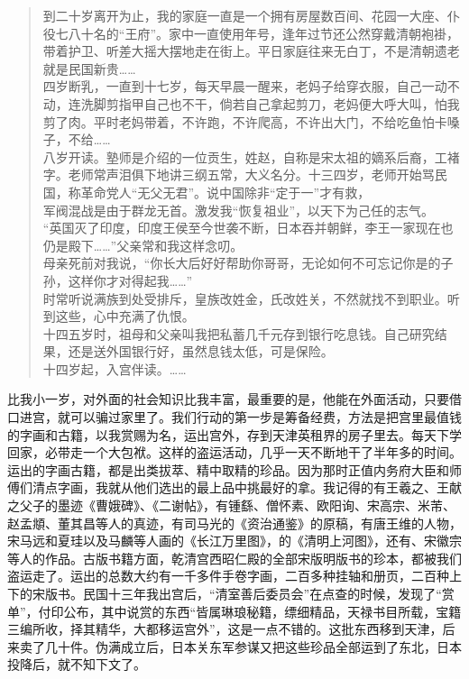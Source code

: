 \begin{quote}
	到二十岁离开为止，我的家庭一直是一个拥有房屋数百间、花园一大座、仆役七八十名的“王府”。家中一直使用年号，逢年过节还公然穿戴清朝袍褂，带着护卫、听差大摇大摆地走在街上。平日家庭往来无白丁，不是清朝遗老就是民国新贵……\\

四岁断乳，一直到十七岁，每天早晨一醒来，老妈子给穿衣服，自己一动不动，连洗脚剪指甲自己也不干，倘若自己拿起剪刀，老妈便大呼大叫，怕我剪了肉。平时老妈带着，不许跑，不许爬高，不许出大门，不给吃鱼怕卡嗓子，不给……\\

八岁开读。塾师是介绍的一位贡生，姓赵，自称是宋太祖的嫡系后裔，工褚字。老师常声泪俱下地讲三纲五常，大义名分。十三四岁，老师开始骂民国，称革命党人“无父无君”。说中国除非“定于一”才有救，\\

军阀混战是由于群龙无首。激发我“恢复祖业”，以天下为己任的志气。\\

“英国灭了印度，印度王侯至今世袭不断，日本吞并朝鲜，李王一家现在也仍是殿下……”父亲常和我这样念叨。\\

母亲死前对我说，“你长大后好好帮助你哥哥，无论如何不可忘记你是的子孙，这样你才对得起我……”\\

时常听说满族到处受排斥，皇族改姓金，氏改姓关，不然就找不到职业。听到这些，心中充满了仇恨。\\

十四五岁时，祖母和父亲叫我把私蓄几千元存到银行吃息钱。自己研究结果，还是送外国银行好，虽然息钱太低，可是保险。\\

十四岁起，入宫伴读。……\\
\end{quote}

比我小一岁，对外面的社会知识比我丰富，最重要的是，他能在外面活动，只要借口进宫，就可以骗过家里了。我们行动的第一步是筹备经费，方法是把宫里最值钱的字画和古籍，以我赏赐为名，运出宫外，存到天津英租界的房子里去。每天下学回家，必带走一个大包袱。这样的盗运活动，几乎一天不断地干了半年多的时间。运出的字画古籍，都是出类拔萃、精中取精的珍品。因为那时正值内务府大臣和师傅们清点字画，我就从他们选出的最上品中挑最好的拿。我记得的有王羲之、王献之父子的墨迹《曹娥碑》、《二谢帖》，有锺繇、僧怀素、欧阳询、宋高宗、米芾、赵孟頫、董其昌等人的真迹，有司马光的《资治通鉴》的原稿，有唐王维的人物，宋马远和夏珪以及马麟等人画的《长江万里图》，的《清明上河图》，还有、宋徽宗等人的作品。古版书籍方面，乾清宫西昭仁殿的全部宋版明版书的珍本，都被我们盗运走了。运出的总数大约有一千多件手卷字画，二百多种挂轴和册页，二百种上下的宋版书。民国十三年我出宫后，“清室善后委员会”在点查的时候，发现了“赏单”，付印公布，其中说赏的东西“皆属琳琅秘籍，缥细精品，天禄书目所载，宝籍三编所收，择其精华，大都移运宫外”，这是一点不错的。这批东西移到天津，后来卖了几十件。伪满成立后，日本关东军参谋又把这些珍品全部运到了东北，日本投降后，就不知下文了。\\

